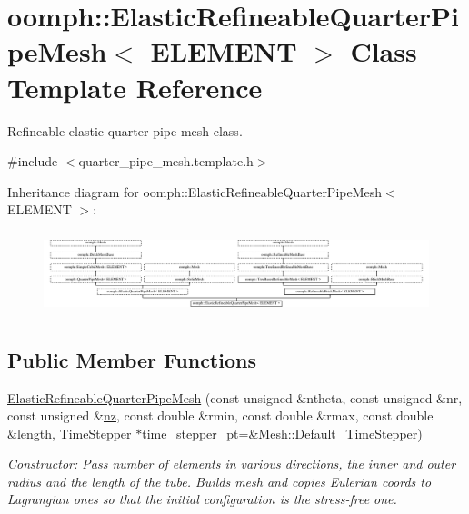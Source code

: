 \hypertarget{classoomph_1_1ElasticRefineableQuarterPipeMesh}{}\section{oomph\+:\+:Elastic\+Refineable\+Quarter\+Pipe\+Mesh$<$ E\+L\+E\+M\+E\+NT $>$ Class Template Reference}
\label{classoomph_1_1ElasticRefineableQuarterPipeMesh}


Refineable elastic quarter pipe mesh class.  




{\ttfamily \#include $<$quarter\+\_\+pipe\+\_\+mesh.\+template.\+h$>$}

Inheritance diagram for oomph\+:\+:Elastic\+Refineable\+Quarter\+Pipe\+Mesh$<$ E\+L\+E\+M\+E\+NT $>$\+:\begin{figure}[H]
\begin{center}
\leavevmode
\includegraphics[height=2.456140cm]{classoomph_1_1ElasticRefineableQuarterPipeMesh}
\end{center}
\end{figure}
\subsection*{Public Member Functions}
\begin{DoxyCompactItemize}
\item 
\hyperlink{classoomph_1_1ElasticRefineableQuarterPipeMesh_a5d90778b3a060b97353b5d9ff5a9dd3d}{Elastic\+Refineable\+Quarter\+Pipe\+Mesh} (const unsigned \&ntheta, const unsigned \&nr, const unsigned \&\hyperlink{classoomph_1_1SimpleCubicMesh_ad78725440e4e87598fd9339653b28e61}{nz}, const double \&rmin, const double \&rmax, const double \&length, \hyperlink{classoomph_1_1TimeStepper}{Time\+Stepper} $\ast$time\+\_\+stepper\+\_\+pt=\&\hyperlink{classoomph_1_1Mesh_a12243d0fee2b1fcee729ee5a4777ea10}{Mesh\+::\+Default\+\_\+\+Time\+Stepper})
\begin{DoxyCompactList}\small\item\em Constructor\+: Pass number of elements in various directions, the inner and outer radius and the length of the tube. Builds mesh and copies Eulerian coords to Lagrangian ones so that the initial configuration is the stress-\/free one. \end{DoxyCompactList}\end{DoxyCompactItemize}
